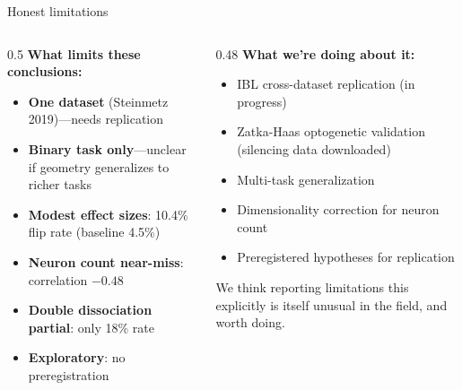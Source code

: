 \documentclass[aspectratio=169,11pt]{beamer}
\begin{document}
\begin{frame}{Honest limitations}
\begin{columns}[T]
\begin{column}{0.5\textwidth}
\textbf{What limits these conclusions:}
\begin{itemize}
  \item \textbf{One dataset} (Steinmetz 2019)---needs replication
  \item \textbf{Binary task only}---unclear if geometry generalizes to richer tasks
  \item \textbf{Modest effect sizes}: 10.4\% flip rate (baseline 4.5\%)
  \item \textbf{Neuron count near-miss}: correlation $-0.48$
  \item \textbf{Double dissociation partial}: only 18\% rate
  \item \textbf{Exploratory}: no preregistration
\end{itemize}
\end{column}
\begin{column}{0.48\textwidth}
\textbf{What we're doing about it:}
\begin{itemize}
  \item IBL cross-dataset replication (in progress)
  \item Zatka-Haas optogenetic validation (silencing data downloaded)
  \item Multi-task generalization
  \item Dimensionality correction for neuron count
  \item Preregistered hypotheses for replication
\end{itemize}

\vspace{0.5em}
{\small We think reporting limitations this explicitly is itself unusual in the field, and worth doing.}
\end{column}
\end{columns}
\end{frame}
\end{document}
